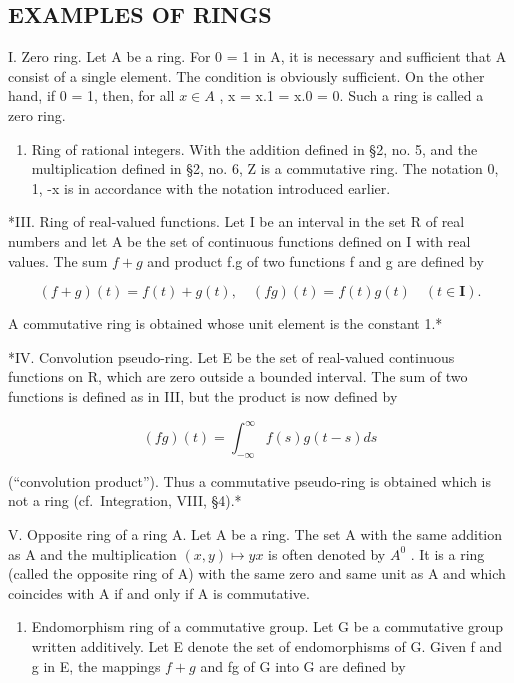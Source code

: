 \subsection{EXAMPLES OF RINGS}

I. Zero ring. Let A be a ring. For 0 = 1 in A, it is necessary and sufficient that A consist of a single element. The condition is obviously sufficient. On the other hand, if 0 = 1, then, for all \(x \in A\) , x = x.1 = x.0 = 0. Such a ring is called a zero ring.

\begin{enumerate}
\def\labelenumi{\Roman{enumi}.}
\setcounter{enumi}{1}
\tightlist
\item
  Ring of rational integers. With the addition defined in §2, no. 5, and the multiplication defined in §2, no. 6, Z is a commutative ring. The notation 0, 1, -x is in accordance with the notation introduced earlier.
\end{enumerate}

*III. Ring of real-valued functions. Let I be an interval in the set R of real numbers and let A be the set of continuous functions defined on I with real values. The sum \(f + g\) and product f.g of two functions f and g are defined by

\[
(f + g) (t) = f (t) + g (t), \quad (f g) (t) = f (t) g (t) \quad (t \in \mathbf {I}).
\]

A commutative ring is obtained whose unit element is the constant 1.*

*IV. Convolution pseudo-ring. Let E be the set of real-valued continuous functions on R, which are zero outside a bounded interval. The sum of two functions is defined as in III, but the product is now defined by

\[
(f g) (t) = \int_ {- \infty} ^ {\infty} f (s) g (t - s) d s
\]

(``convolution product''). Thus a commutative pseudo-ring is obtained which is not a ring (cf.~Integration, VIII, §4).*

V. Opposite ring of a ring A. Let A be a ring. The set A with the same addition as A and the multiplication \((x,y)\mapsto yx\) is often denoted by \(A^{0}\) . It is a ring (called the opposite ring of A) with the same zero and same unit as A and which coincides with A if and only if A is commutative.

\begin{enumerate}
\def\labelenumi{\Roman{enumi}.}
\setcounter{enumi}{5}
\tightlist
\item
  Endomorphism ring of a commutative group. Let G be a commutative group written additively. Let E denote the set of endomorphisms of G. Given f and g in E, the mappings \(f + g\) and fg of G into G are defined by
\end{enumerate}

